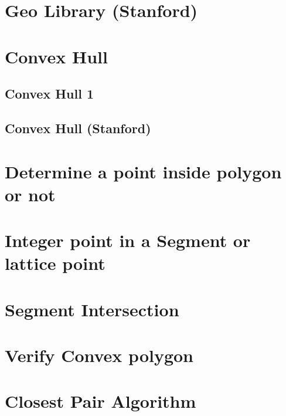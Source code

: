 \documentclass[11pt]{report}
\begin{document}
\section{Geo Library (Stanford)}

\section{Convex Hull}
\subsection{Convex Hull 1}

\subsection{Convex Hull (Stanford)}

\section{Determine a point inside polygon or not}

\section{Integer point in a Segment or lattice point}

\section{Segment Intersection}

\section{Verify Convex polygon}

\section{Closest Pair Algorithm}

\end{document}
